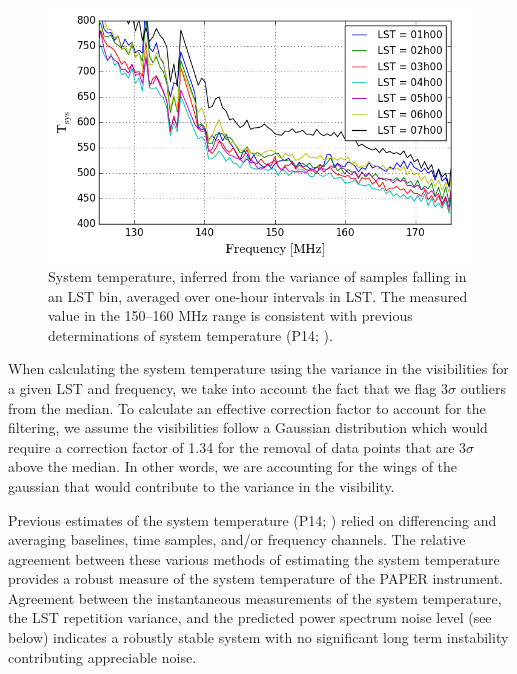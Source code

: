 \documentclass[twocolumn,numberedappendix]{emulateapj} \shorttitle{PSA64}
\begin{document}
\begin{figure}\centering
\includegraphics[width=\columnwidth]{plots/tsys.png}
\caption{System temperature, inferred from the variance of samples falling 
in an LST bin, averaged over one-hour intervals in LST.  The measured value
in the 150--160 MHz range is consistent with previous determinations of
system temperature (P14; \citealt{jacobs_et_al2014}).
}\label{fig:tsys}
\end{figure}

When calculating the system temperature using the variance in the visibilities
for a given LST and frequency, we take into account the fact that we flag
3$\sigma$ outliers from the median. To calculate an effective correction factor
to account for the filtering, we assume the visibilities follow a Gaussian
distribution which would require a correction factor of 1.34 for the removal of
data points that are 3$\sigma$ above the median. In other words, we are
accounting for the wings of the gaussian that would contribute to the variance
in the visibility.

Previous estimates
of the system temperature
(P14; \citealt{jacobs_et_al2014}) relied on differencing and averaging
baselines, time samples, and/or frequency channels. The relative agreement
between these various methods of estimating the system temperature provides a
robust measure of the system temperature of the PAPER instrument. Agreement
between the instantaneous measurements of the system temperature, the LST
repetition variance, and the predicted power spectrum noise level (see below)
indicates a robustly stable system with no significant long term instability
contributing appreciable noise.
\end{document}
